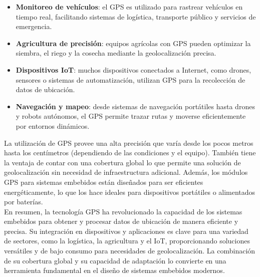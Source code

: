 \begin{itemize}
    \item \textbf{Monitoreo de vehículos}: el GPS es utilizado para rastrear vehículos en tiempo real, facilitando sistemas de logística, transporte público y servicios de emergencia.

    \item \textbf{Agricultura de precisión}: equipos agrícolas con GPS pueden optimizar la siembra, el riego y la cosecha mediante la geolocalización precisa.

    \item \textbf{Dispositivos IoT}: muchos dispositivos conectados a Internet, como drones, sensores o sistemas de automatización, utilizan GPS para la recolección de datos de ubicación.

    \item \textbf{Navegación y mapeo}: desde sistemas de navegación portátiles hasta drones y robots autónomos, el GPS permite trazar rutas y moverse eficientemente por entornos dinámicos.
\end{itemize}


La utilización de GPS provee una alta precisión que varía desde los pocos metros hasta los centímetros (dependiendo de las condiciones y el equipo). También tiene la ventaja de contar con una cobertura global lo que permite una solución de geolocalización sin necesidad de infraestructura adicional. Además, los módulos GPS para sistemas embebidos están diseñados para ser eficientes energéticamente, lo que los hace ideales para dispositivos portátiles o alimentados por baterías. \\ 

En resumen, la tecnología GPS ha revolucionado la capacidad de los sistemas embebidos para obtener y procesar datos de ubicación de manera eficiente y precisa. Su integración en dispositivos y aplicaciones es clave para una variedad de sectores, como la logística, la agricultura y el IoT, proporcionando soluciones versátiles y de bajo consumo para necesidades de geolocalización. La combinación de su cobertura global y su capacidad de adaptación lo convierte en una herramienta fundamental en el diseño de sistemas embebidos modernos.